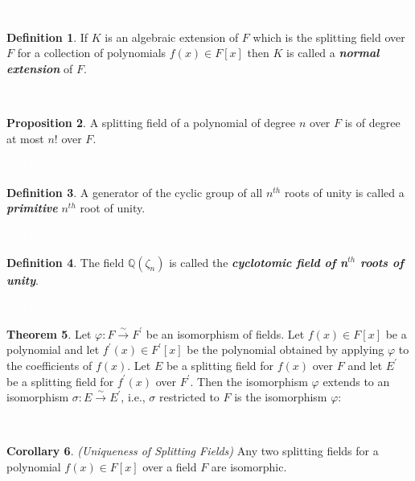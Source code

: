 \documentclass{article}
\theoremstyle{definition}
\newtheorem{thm}{Theorem}[section]
\newtheorem{prop}[thm]{Proposition}
\newtheorem{cor}[thm]{Corollary}
\newtheorem{defn}[thm]{Definition}
\newcommand{\nl}{\textcolor{white}{nothing}}
\newcommand{\ra}{\rightarrow}
\newcommand{\p}{\prime}
\newcommand{\Q}{\mathbb{Q}}
\newcommand{\vphi}{\varphi}
\begin{document}
\nl

\begin{defn}
If $K$ is an algebraic extension of $F$ which is the splitting field over $F$ for a collection of polynomials $f(x)\in F[x]$ then $K$ is called a \textit{\textbf{normal extension}} of $F$.
\end{defn}

\nl

\begin{prop}
A splitting field of a polynomial of degree $n$ over $F$ is of degree at most $n!$ over $F$.
\end{prop}

\nl

\begin{defn}
A generator of the cyclic group of all $n^{th}$ roots of unity is called a \textit{\textbf{primitive}} $n^{th}$ root of unity.
\end{defn}

\nl

\begin{defn}
The field $\Q(\zeta_n)$ is called the \textit{\textbf{cyclotomic field of n$^{th}$ roots of unity}}.
\end{defn}

\nl

\begin{thm}
Let $\vphi: F\overset{\sim}{\ra} F^\p$ be an isomorphism of fields. Let $f(x)\in F[x]$ be a polynomial and let $f^\p(x)\in F^\p[x]$ be the polynomial obtained by applying $\vphi$ to the coefficients of $f(x)$. Let $E$ be a splitting field for $f(x)$ over $F$ and let $E^\p$ be a splitting field for $f^\p(x)$ over $F^\p$. Then the isomorphism $\vphi$ extends to an isomorphism $\sigma: E\overset{\sim}{\ra} E^\p$, i.e., $\sigma$ restricted to $F$ is the isomorphism $\vphi$:
\begin{center}
\end{center}
\end{thm}

\nl

\begin{cor}\textit{(Uniqueness of Splitting Fields)}
Any two splitting fields for a polynomial $f(x)\in F[x]$ over a field $F$ are isomorphic.
\end{cor}
\end{document}

